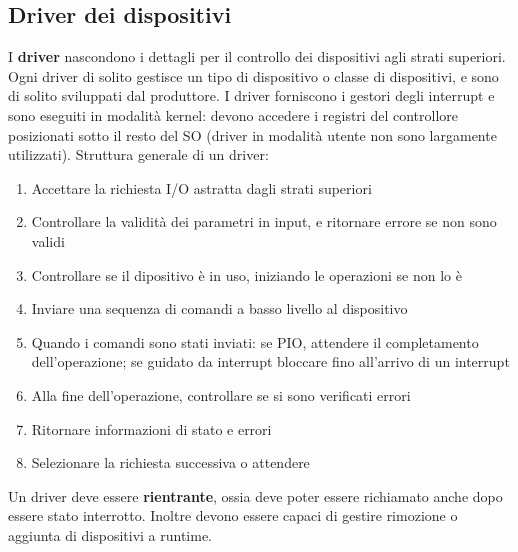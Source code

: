 \documentclass[12pt]{article}
\begin{document}
\subsection{Driver dei dispositivi}
I \textbf{driver} nascondono i dettagli per il controllo dei dispositivi agli strati superiori. Ogni driver di solito gestisce 
un tipo di dispositivo o classe di dispositivi, e sono di solito sviluppati dal produttore. I driver forniscono i gestori 
degli interrupt e sono eseguiti in modalità kernel: devono accedere i registri del controllore posizionati sotto il resto 
del SO (driver in modalità utente non sono largamente utilizzati). Struttura generale di un driver:
\begin{enumerate}
    \item Accettare la richiesta I/O astratta dagli strati superiori
    \item Controllare la validità dei parametri in input, e ritornare errore se non sono validi 
    \item Controllare se il dipositivo è in uso, iniziando le operazioni se non lo è
    \item Inviare una sequenza di comandi a basso livello al dispositivo
    \item Quando i comandi sono stati inviati: se PIO, attendere il completamento dell'operazione; se guidato da interrupt 
    bloccare fino all'arrivo di un interrupt
    \item Alla fine dell'operazione, controllare se si sono verificati errori 
    \item Ritornare informazioni di stato e errori 
    \item Selezionare la richiesta successiva o attendere 
\end{enumerate}
Un driver deve essere \textbf{rientrante}, ossia deve poter essere richiamato anche dopo essere stato interrotto. Inoltre 
devono essere capaci di gestire rimozione o aggiunta di dispositivi a runtime.
\end{document}
